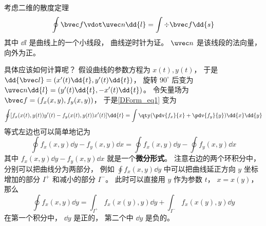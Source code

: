 
\begin{issues}
\issueDraft
{}
\end{issues}


考虑二维的散度定理
\begin{equation}\label{DForm_eq1}
\oint \bvec f \vdot \uvec n \dd{l} = \int \div \bvec f \dd{s}
\end{equation}
其中 $\dd{l}$ 是曲线上的一个小线段， 曲线逆时针为证。 $\uvec n$ 是该线段的法向量， 向外为正。

具体应该如何计算呢？ 假设曲线的参数方程为 $x(t), y(t)$， 于是 $\dd{\bvec l} = (x'(t)\dd{t}, y'(t)\dd{t})$， 旋转 $90^\circ$ 后变为 $\uvec n \dd{l} = (y'(t)\dd{t}, -x'(t)\dd{t})$。 令矢量场为 $\bvec f = (f_x(x,y), f_y(x,y))$， 于是\autoref{DForm_eq1} 变为
\begin{equation}
\oint [f_x(x(t),y(t)) y'(t) - f_y(x(t),y(t)) x'(t)]\dd{t}
= \int \qty(\pdv{f_x}{x} + \pdv{f_y}{y}) \dd{x}\dd{y}
\end{equation}
等式左边也可以简单地记为
\begin{equation}
\oint f_x(x,y) \dd{y} - f_y(x,y) \dd{x} = \oint f_x(x,y) \dd{y} - \oint f_y(x,y) \dd{x}
\end{equation}
其中 $f_x(x,y) \dd{y} - f_y(x,y) \dd{x}$ 就是一个\textbf{微分形式}。 注意右边的两个环积分中， 分别可以把曲线分为两部分， 例如 $\oint f_x(x,y) \dd{y}$ 中可以把曲线延正方向 $y$ 坐标增加的部分 $I^+$ 和减小的部分 $I^-$。 此时可以直接用 $y$ 作为参数 $t$， $x = x(y)$， 那么
\begin{equation}
\oint f_x(x,y) \dd{y} = \int_{I^+} f_x(x(y),y) \dd{y} + \int_{I^-} f_x(x(y),y) \dd{y}
\end{equation}
在第一个积分中， $\dd{y}$ 是正的， 第二个中 $\dd{y}$ 是负的。

